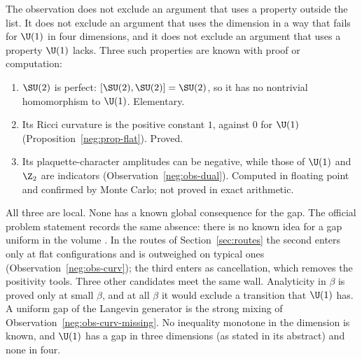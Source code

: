 The observation does not exclude an argument that uses a property outside the list. It does
not exclude an argument that uses the dimension in a way that fails for $\U(1)$ in four
dimensions, and it does not exclude an argument that uses a property $\U(1)$ lacks. Three such
properties are known with proof or computation:
\begin{enumerate}
\item $\SU(2)$ is perfect: $[\SU(2),\SU(2)]=\SU(2)$, so it has no nontrivial homomorphism to
$\U(1)$. Elementary.
\item Its Ricci curvature is the positive constant $1$, against $0$ for $\U(1)$
(Proposition~\ref{neg:prop-flat}). Proved.
\item Its plaquette-character amplitudes can be negative, while those of $\U(1)$ and $\Z_2$ are
indicators (Observation~\ref{neg:obs-dual}). Computed in floating point and confirmed by Monte
Carlo; not proved in exact arithmetic.
\end{enumerate}
All three are local. None has a known global consequence for the gap. The official problem
statement records the same absence: there is no known idea for a gap uniform in the volume
\cite{JW}. In the routes of
Section~\ref{sec:routes} the second enters only at flat configurations and is outweighed on
typical ones (Observation~\ref{neg:obs-curv}); the third enters as cancellation, which removes
the positivity tools. Three other candidates meet the same wall. Analyticity in $\beta$ is
proved only at small $\beta$, and at all $\beta$ it would exclude a transition that $\U(1)$ has.
A uniform gap of the Langevin generator is the strong mixing of
Observation~\ref{neg:obs-curv-missing}. No inequality monotone in the dimension is known, and
$\U(1)$ has a gap in three dimensions \cite{GM82} (as stated in its abstract) and none in four.

